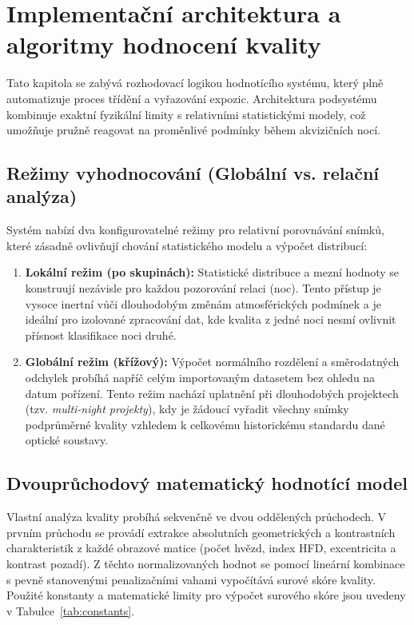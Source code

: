 \chapter{Implementační architektura a algoritmy hodnocení kvality}
\label{ch:grading}

Tato kapitola se zabývá rozhodovací logikou hodnotícího systému, který plně automatizuje proces třídění a vyřazování expozic. Architektura podsystému kombinuje exaktní fyzikální limity s relativními statistickými modely, což umožňuje pružně reagovat na proměnlivé podmínky během akvizičních nocí.

\section{Režimy vyhodnocování (Globální vs. relační analýza)}
Systém nabízí dva konfigurovatelné režimy pro relativní porovnávání snímků, které zásadně ovlivňují chování statistického modelu a výpočet distribucí:

\begin{enumerate}
    \item \textbf{Lokální režim (po skupinách):} Statistické distribuce a mezní hodnoty se konstruují nezávisle pro každou pozorování relaci (noc). Tento přístup je vysoce inertní vůči dlouhodobým změnám atmosférických podmínek a je ideální pro izolované zpracování dat, kde kvalita z jedné noci nesmí ovlivnit přísnost klasifikace noci druhé.
    \item \textbf{Globální režim (křížový):} Výpočet normálního rozdělení a směrodatných odchylek probíhá napříč celým importovaným datasetem bez ohledu na datum pořízení. Tento režim nachází uplatnění při dlouhodobých projektech (tzv. \textit{multi-night projekty}), kdy je žádoucí vyřadit všechny snímky podprůměrné kvality vzhledem k celkovému historickému standardu dané optické soustavy.
\end{enumerate}

\section{Dvouprůchodový matematický hodnotící model}
Vlastní analýza kvality probíhá sekvenčně ve dvou oddělených průchodech. V prvním průchodu se provádí extrakce absolutních geometrických a kontrastních charakteristik z každé obrazové matice (počet hvězd, index \ac{HFD}, excentricita a kontrast pozadí). Z těchto normalizovaných hodnot se pomocí lineární kombinace s pevně stanovenými penalizačními vahami vypočítává surové skóre kvality. Použité konstanty a matematické limity pro výpočet surového skóre jsou uvedeny v Tabulce~\ref{tab:constants}.

